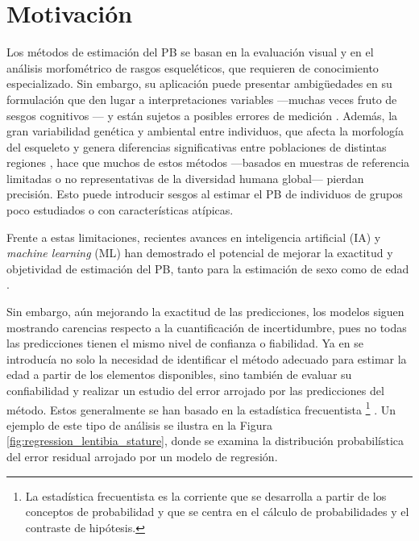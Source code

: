 
\section{Motivación}

Los métodos de estimación del \acrshort{PB} se basan en la evaluación visual y en el análisis morfométrico de rasgos esqueléticos, que requieren de conocimiento especializado. Sin embargo, su aplicación puede presentar ambigüedades en su formulación que den lugar a interpretaciones variables ---muchas veces fruto de sesgos cognitivos \cite{nakhaeizadeh2014, cooper2019}--- y están sujetos a posibles errores de medición \cite{langley2018}. Además, la gran variabilidad genética y ambiental entre individuos, que afecta la morfología del esqueleto y genera diferencias significativas entre poblaciones de distintas regiones \cite{ubelaker2017}, hace que muchos de estos métodos ---basados en muestras de referencia limitadas o no representativas de la diversidad humana global--- pierdan precisión. Esto puede introducir sesgos al estimar el \acrshort{PB} de individuos de grupos poco estudiados o con características atípicas.

Frente a estas limitaciones, recientes avances en inteligencia artificial (\acrshort{IA}) y \textit{machine learning} (\acrshort{ML}) han demostrado el potencial de mejorar la exactitud y objetividad de estimación del \acrshort{PB}, tanto para la estimación de sexo \cite{curate2017, darmawan2015, pinto2016} como de edad \cite{kim2017, larson2018, lee2017}.

Sin embargo, aún mejorando la exactitud de las predicciones, los modelos siguen mostrando carencias respecto a la cuantificación de incertidumbre, pues no todas las predicciones tienen el mismo nivel de confianza o fiabilidad. Ya en \cite{ferrante2009} se introducía no solo la necesidad de identificar el método adecuado para estimar la edad a partir de los elementos disponibles, sino también de evaluar su confiabilidad y realizar un estudio del error arrojado por las predicciones del método. Estos generalmente se han basado en la estadística frecuentista%
\footnote{
    La estadística frecuentista es la corriente que se desarrolla a partir de los conceptos de probabilidad y que se centra en el cálculo de probabilidades y el contraste de hipótesis.
}
\cite{verma2020, stepanovsky2024, heinrich2024}. Un ejemplo de este tipo de análisis se ilustra en la Figura \ref{fig:regression_lentibia_stature}, donde se examina la distribución probabilística del error residual arrojado por un modelo de regresión.

